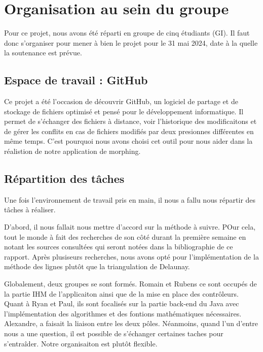 \section{Organisation au sein du groupe}

Pour ce projet, nous avons été réparti en groupe de cinq étudiants (GI). Il faut donc s'organiser pour mener à bien le projet pour le 31 mai 2024, date à la quelle la soutenance est prévue.


\subsection{Espace de travail : GitHub}

Ce projet a été l'occasion de découvrir GitHub, un logiciel de partage et de stockage de fichiers optimisé et pensé pour le développement informatique. Il permet de s'échanger des fichiers à distance, voir l'historique des modificaitons et de gérer les conflits en cas de fichiers modifiés par deux presionnes différentes en même temps. C'est pourquoi nous avons choisi cet outil pour nous aider dans la réalistion de notre application de morphing.


\subsection{Répartition des tâches}

Une fois l'environnement de travail pris en main, il nous a fallu nous répartir des tâches à réaliser.

D'abord, il nous fallait nous mettre d'accord sur la méthode à suivre. POur cela, tout le monde à fait des recherches de son côté durant la première semaine en notant les sources consultées qui seront notées dans la bibliographie de ce rapport. Après plusiseurs recherches, nous avons opté pour l'implémentation de la méthode des lignes plutôt que la triangulation de Delaunay.

Globalement, deux groupes se sont formés. Romain et Rubens ce sont occupés de la partie IHM de l'applicaiton ainsi que de la mise en place des contrôleurs. Quant à Ryan et Paul, ils sont focalisés sur la partie back-end du Java avec l'implémentation des algorithmes et des fontions mathématiques nécessaires. Alexandre, a faisait la liaison entre les deux pôles. Néanmoins, quand l'un d'entre nous a une question, il est possible de s'échanger certaines taches pour s'entraîder. Notre organisaiton est plutôt flexible.



